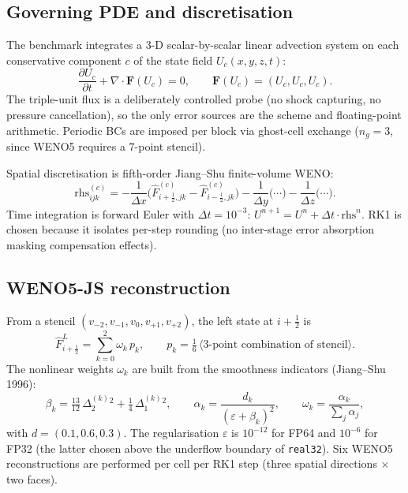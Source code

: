 \documentclass[11pt,a4paper]{article}
\begin{document}
\subsection{Governing PDE and discretisation}
\label{sec:pde}

The benchmark integrates a 3-D scalar-by-scalar linear advection
system on each conservative component \(c\) of the state field
\(U_c(x,y,z,t)\):
\begin{equation}
\frac{\partial U_c}{\partial t} + \nabla \cdot \mathbf{F}(U_c) = 0,
\qquad \mathbf{F}(U_c) = (U_c, U_c, U_c).
\end{equation}
The triple-unit flux is a deliberately controlled probe (no shock
capturing, no pressure cancellation), so the only error sources are
the scheme and floating-point arithmetic.  Periodic BCs are imposed
per block via ghost-cell exchange ($n_g = 3$, since WENO5 requires a
7-point stencil).

Spatial discretisation is fifth-order Jiang--Shu finite-volume WENO:
\begin{equation}
\mathrm{rhs}_{ijk}^{(c)} = - \frac{1}{\Delta x}
\bigl(\hat F_{i+\tfrac12,jk}^{(c)} - \hat F_{i-\tfrac12,jk}^{(c)}\bigr)
- \frac{1}{\Delta y}\bigl(\cdots\bigr) - \frac{1}{\Delta z}\bigl(\cdots\bigr).
\end{equation}
Time integration is forward Euler with \(\Delta t = 10^{-3}\):
\(U^{n+1} = U^n + \Delta t \cdot \mathrm{rhs}^n\). RK1 is chosen
because it isolates per-step rounding (no inter-stage error
absorption masking compensation effects).

\subsection{WENO5-JS reconstruction}
\label{sec:weno5}

From a stencil \((v_{-2}, v_{-1}, v_0, v_{+1}, v_{+2})\), the left
state at \(i+\tfrac12\) is
\begin{equation}
\hat F^L_{i+\tfrac12} = \sum_{k=0}^{2} \omega_k\, p_k, \qquad
p_k = \tfrac{1}{6}\,\langle\text{3-point combination of stencil}\rangle.
\end{equation}
The nonlinear weights \(\omega_k\) are built from the smoothness
indicators (Jiang--Shu 1996):
\begin{equation}
\beta_k = \tfrac{13}{12}\,\Delta_2^{(k)}\!^2 + \tfrac{1}{4}\,\Delta_1^{(k)}\!^2,
\qquad
\alpha_k = \frac{d_k}{(\varepsilon + \beta_k)^2},
\qquad
\omega_k = \frac{\alpha_k}{\sum_j \alpha_j},
\end{equation}
with \(d = (0.1, 0.6, 0.3)\). The regularisation
\(\varepsilon\) is \(10^{-12}\) for FP64 and \(10^{-6}\) for FP32
(the latter chosen above the underflow boundary of \texttt{real32}).
Six WENO5 reconstructions are performed per cell per RK1 step (three
spatial directions \(\times\) two faces).
\end{document}
